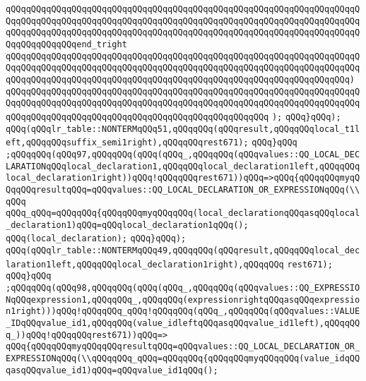 \verb|qQQqqQQqqQQqqQQqqQQqqQQqqQQqqQQqqQQqqQQqqQQqqQQqqQQqqQQqqQQqqQQqqQQqqQQqqQQqqQQqqQQqqQQqqQQqqQQqqQQqqQQqqQQqqQQqqQQqqQQqqQQqqQQqqQQqqQQqqQQqqQQqqQQqqQQqqQQqqQQqqQQqqQQqqQQqqQQqqQQqqQQqqQQqqQQqqQQqqQQqqQQqqQQqqQQqqQQqqQQqqQQqend_tright|\newline
\verb|qQQqqQQqqQQqqQQqqQQqqQQqqQQqqQQqqQQqqQQqqQQqqQQqqQQqqQQqqQQqqQQqqQQqqQQqqQQqqQQqqQQqqQQqqQQqqQQqqQQqqQQqqQQqqQQqqQQqqQQqqQQqqQQqqQQqqQQqqQQqqQQqqQQqqQQqqQQqqQQqqQQqqQQqqQQqqQQqqQQqqQQqqQQqqQQqqQQqqQQqqQQqqQQq)|\newline
\verb|qQQqqQQqqQQqqQQqqQQqqQQqqQQqqQQqqQQqqQQqqQQqqQQqqQQqqQQqqQQqqQQqqQQqqQQqqQQqqQQqqQQqqQQqqQQqqQQqqQQqqQQqqQQqqQQqqQQqqQQqqQQqqQQqqQQqqQQqqQQqqQQqqQQqqQQqqQQqqQQqqQQqqQQqqQQqqQQqqQQqqQQqqQQqqQQq|\newline
\verb|);|\newline
\verb|qQQq}qQQq);|\newline
\verb|qQQq(qQQqlr_table::NONTERMqQQq51,qQQqqQQq(qQQqresult,qQQqqQQqlocal_t1left,qQQqqQQqsuffix_semi1right),qQQqqQQqrest671);|\newline
\verb|qQQq}qQQq|\newline
\verb|;qQQqqQQq(qQQq97,qQQqqQQq(qQQq(qQQq_,qQQqqQQq(qQQqvalues::QQ_LOCAL_DECLARATIONqQQqlocal_declaration1,qQQqqQQqlocal_declaration1left,qQQqqQQqlocal_declaration1right))qQQq!qQQqqQQqrest671))qQQq=>qQQq{qQQqqQQqmyqQQqqQQqresultqQQq=qQQqvalues::QQ_LOCAL_DECLARATION_OR_EXPRESSIONqQQq(\\qQQq|\newline
\verb|qQQq_qQQq=qQQqqQQq{qQQqqQQqmyqQQqqQQq(local_declarationqQQqasqQQqlocal_declaration1)qQQq=qQQqlocal_declaration1qQQq();|\newline
\verb|qQQq(local_declaration);|\newline
\verb|qQQq}qQQq);|\newline
\verb|qQQq(qQQqlr_table::NONTERMqQQq49,qQQqqQQq(qQQqresult,qQQqqQQqlocal_declaration1left,qQQqqQQqlocal_declaration1right),qQQqqQQq|\newline
\verb|rest671);|\newline
\verb|qQQq}qQQq|\newline
\verb|;qQQqqQQq(qQQq98,qQQqqQQq(qQQq(qQQq_,qQQqqQQq(qQQqvalues::QQ_EXPRESSIONqQQqexpression1,qQQqqQQq_,qQQqqQQq(expressionrightqQQqasqQQqexpression1right)))qQQq!qQQqqQQq_qQQq!qQQqqQQq(qQQq_,qQQqqQQq(qQQqvalues::VALUE_IDqQQqvalue_id1,qQQqqQQq(value_idleftqQQqasqQQqvalue_id1left),qQQqqQQq_))qQQq!qQQqqQQqrest671))qQQq=>|\newline
\verb|qQQq{qQQqqQQqmyqQQqqQQqresultqQQq=qQQqvalues::QQ_LOCAL_DECLARATION_OR_EXPRESSIONqQQq(\\qQQqqQQq_qQQq=qQQqqQQq{qQQqqQQqmyqQQqqQQq(value_idqQQqasqQQqvalue_id1)qQQq=qQQqvalue_id1qQQq();|\newline
